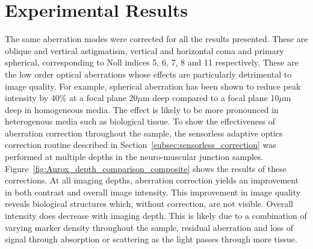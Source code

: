 \section{Experimental Results}
\label{sec:Aurox_results}

The same aberration modes were corrected for all the results presented. 
These are oblique and vertical astigmatism, vertical and horizontal coma 
and primary spherical, corresponding to Noll indices 5, 6, 7, 8 and 11 
respectively\cite{noll1976zernike}. These are the low order optical 
aberrations whose effects are particularly detrimental to image quality. For example, 
spherical aberration has been shown to reduce peak intensity by 40\% at
a focal plane 20$\mu$m deep compared to a focal plane 10$\mu$m 
deep in homogeneous media\cite{hell1993aberrations}. The effect is likely to be more pronounced in heterogenous media such as biological tissue. To show the effectiveness of aberration 
correction throughout the sample, the sensorless adaptive optics correction
routine described in Section~\ref{subsec:sensorless_correction} was performed
at multiple depths in the neuro-muscular junction samples. Figure~\ref{fig:Aurox_depth_comparison_composite} shows the results of 
these corrections. At all imaging depths, aberration correction yields an 
improvement in both contrast and overall image intensity. This improvement 
in image quality reveals biological structures which, without correction, 
are not visible. Overall intensity does decrease with imaging depth. This 
is likely due to a combination of varying marker density throughout the 
sample, residual aberration and loss of signal through absorption or 
scattering as the light passes through more tissue.

